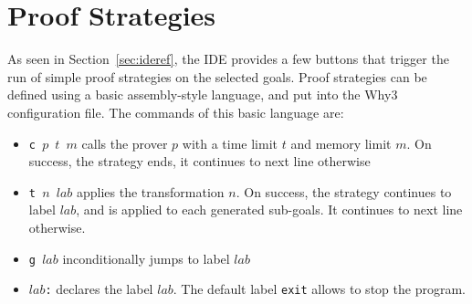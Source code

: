 \section{Proof Strategies}
\label{sec:strategies}

As seen in Section~\ref{sec:ideref}, the IDE provides a few buttons
that trigger the run of simple proof strategies on the selected goals.
Proof strategies can be defined using a basic assembly-style language,
and put into the Why3 configuration file. The commands of this basic
language are:
\begin{itemize}
\item \texttt{c $p$ $t$ $m$} calls the prover $p$ with a time limit
  $t$ and memory limit $m$. On success, the strategy ends, it
  continues to next line otherwise
\item \texttt{t $n$ $lab$} applies the transformation $n$. On success,
  the strategy continues to label $lab$, and is applied to each
  generated sub-goals.  It continues to next line otherwise.
\item \texttt{g $lab$} inconditionally jumps to label $lab$
\item \texttt{$lab$:} declares the label $lab$. The default label
  \texttt{exit} allows to stop the program.
\end{itemize}

